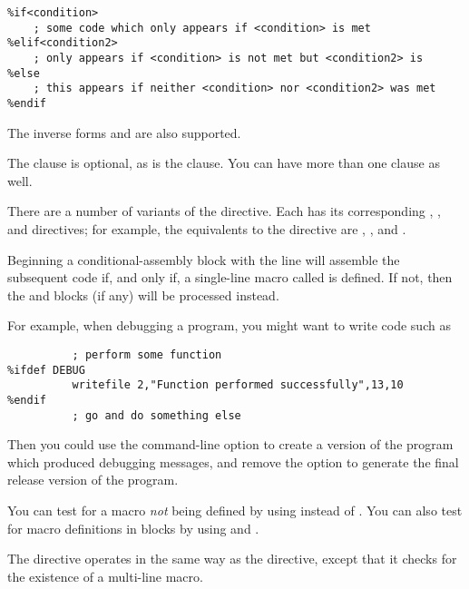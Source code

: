\begin{lstlisting}
%if<condition>
    ; some code which only appears if <condition> is met
%elif<condition2>
    ; only appears if <condition> is not met but <condition2> is
%else
    ; this appears if neither <condition> nor <condition2> was met
%endif
\end{lstlisting}

The inverse forms  and  are also supported.

The  clause is optional, as is the  clause.
You can have more than one  clause as well.

There are a number of variants of the  directive.  Each has its
corresponding , , and  directives; for
example, the equivalents to the  directive are ,
, and .


Beginning a conditional-assembly block with the line 
will assemble the subsequent code if, and only if, a single-line macro called
 is defined. If not, then the  and 
blocks (if any) will be processed instead.

For example, when debugging a program, you might want to write code
such as

\begin{lstlisting}
          ; perform some function
%ifdef DEBUG
          writefile 2,"Function performed successfully",13,10
%endif
          ; go and do something else
\end{lstlisting}

Then you could use the command-line option  to create a
version of the program which produced debugging messages, and remove
the option to generate the final release version of the program.

You can test for a macro \emph{not} being defined by using
 instead of . You can also test
for macro definitions in  blocks by using
 and .


The  directive operates in the same way as the 
directive, except that it checks for the existence of a multi-line macro.

